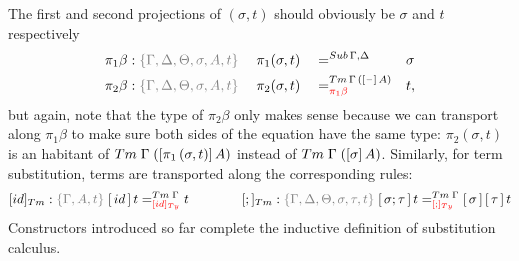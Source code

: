 \documentclass[a4paper,UKenglish,numberwithinsect,cleveref,thm-restate]{lipics-v2021}
\begin{document}
The first and second projections of $(\sigma, t)$ should obviously be $\sigma$ and $t$ respectively
\begin{alignat*}{5}
  \pi_1\beta      & : \implicit{\Gamma, \Delta, \Theta, \sigma, A, t}\; && \pi_1(\sigma , t)        && =^{\Sub\,\Gamma,\Delta} &&  \sigma \\
  \pi_2\beta      & : \implicit{\Gamma, \Delta, \Theta, \sigma, A, t}\; && \pi_2(\sigma , t)        && =^{\Tm\,\Gamma\,([\blank]\,A)}_{\alert{\pi_1\beta}} &&  t, 
\end{alignat*}
but again, note that the type of $\pi_2\beta$ only makes sense because we can transport along $\pi_1\beta$ to make sure both sides of the equation have the same type: $\pi_2(\sigma, t)$ is an habitant of $\Tm\;\Gamma\;([\pi_1\,(\sigma, t)]\,A)$ instead of $\Tm\;\Gamma\;([\sigma]\,A)$.
%
Similarly, for term substitution, terms are transported along the corresponding rules:
\[
  [\idS]_{\Tm} : \implicit{\Gamma, A, t}\; {[\,\idS\,]\,t} =^{\Tm\;\Gamma}_{\alert{[\idS]_\Ty}} t
  \qquad\qquad
  [;]_{\Tm}    : \implicit{\Gamma, \Delta, \Theta, \sigma, \tau, t}\; {[\,\sigma ; \tau\,]\,t} =^{\Tm\;\Gamma}_{\alert{[;]_{\Ty}}}{[\, \sigma\,]\,[\,\tau\,]\,t}
\]
Constructors introduced so far complete the inductive definition of substitution calculus.
\end{document}
